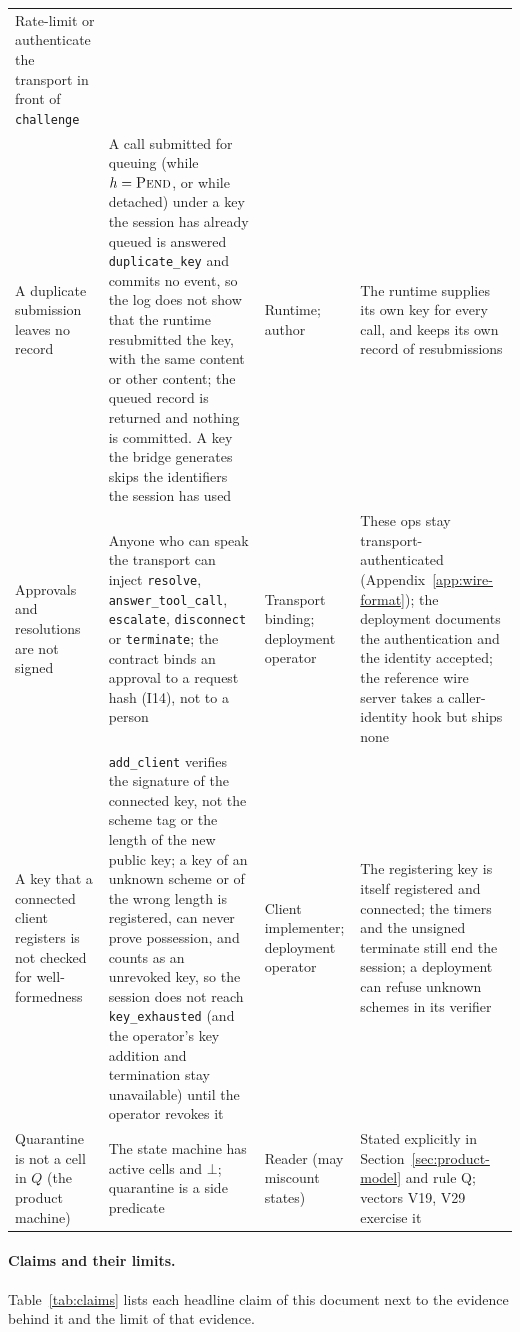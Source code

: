 \begin{longtable}{p{} p{} p{} p{}}
Rate-limit or authenticate the transport in front of \texttt{challenge} \\
A duplicate submission leaves no record &
A call submitted for queuing (while $h=\textsc{Pend}$, or while detached) under a key the session has already queued is answered \texttt{duplicate\_key} and commits no event, so the log does not show that the runtime resubmitted the key, with the same content or other content; the queued record is returned and nothing is committed. A key the bridge generates skips the identifiers the session has used &
Runtime; author &
The runtime supplies its own key for every call, and keeps its own record of resubmissions \\
Approvals and resolutions are not signed &
Anyone who can speak the transport can inject \texttt{resolve}, \texttt{answer\_tool\_call}, \texttt{escalate}, \texttt{disconnect} or \texttt{terminate}; the contract binds an approval to a request hash (I14), not to a person &
Transport binding; deployment operator &
These ops stay transport-authenticated (Appendix~\ref{app:wire-format}); the deployment documents the authentication and the identity accepted; the reference wire server takes a caller-identity hook but ships none \\
A key that a connected client registers is not checked for well-formedness &
\texttt{add\_client} verifies the signature of the connected key, not the scheme tag or the length of the new public key; a key of an unknown scheme or of the wrong length is registered, can never prove possession, and counts as an unrevoked key, so the session does not reach \texttt{key\_exhausted} (and the operator's key addition and termination stay unavailable) until the operator revokes it &
Client implementer; deployment operator &
The registering key is itself registered and connected; the timers and the unsigned terminate still end the session; a deployment can refuse unknown schemes in its verifier \\
Quarantine is not a cell in $Q$ (the product machine) &
The state machine has active cells and $\bot$; quarantine is a side predicate &
Reader (may miscount states) &
Stated explicitly in Section~\ref{sec:product-model} and rule Q; vectors V19, V29 exercise it \\
\bottomrule
\end{longtable}

\paragraph{Claims and their limits.} Table~\ref{tab:claims} lists each
headline claim of this document next to the evidence behind it and the
limit of that evidence.

